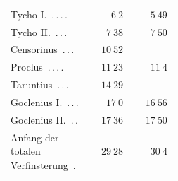 \begin{center}
\begin{tabular}{@{}p{0.47\linewidth}|r|r@{}}
Tycho I.\ \mbox{.\,.\,.\,.} & $6\ 2$ & $5\ 49$\\
Tycho II.\ \mbox{.\,.\,.} & $7\ 38$ & $7\ 50$\\
Censorinus\ \mbox{.\,.\,.} & $10\ 52$ & \\
Proclus\ \mbox{.\,.\,.\,.} & $11\ 23$ & $11\ 4$\\
Taruntius\ \mbox{.\,.\,.} & $14\ 29$ & \\
Goclenius I.\ \mbox{.\,.\,.} & $17\ 0$ & $16\ 56$\\
Goclenius II.\ \mbox{.\,.} & $17\ 36$ & $17\ 50$\\
Anfang der totalen Verfinsterung\ \mbox{.} & $29\ 28$ & $30\ 4$\\
\end{tabular}\endgroup\end{center}

